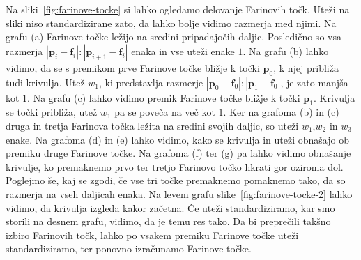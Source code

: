 \documentclass[isrm2, tisk]{fmfdelo}
\newcommand{\p}{\mathbf{p}}
\begin{document}
    Na sliki~\ref{fig:farinove-tocke} si lahko ogledamo delovanje Farinovih točk.
    Uteži na sliki niso standardizirane zato, da lahko bolje vidimo razmerja med njimi.
    Na grafu (a) Farinove točke ležijo na sredini pripadajočih daljic.
    Posledično so vsa razmerja $|\p_i-\mathbf{f}_i|:|\p_{i+1}-\mathbf{f}_i|$ enaka in vse uteži enake $1$.
    Na grafu (b) lahko vidimo, da se s premikom prve Farinove točke bližje k točki $\p_0$, k njej približa tudi krivulja.
    Utež $w_1$, ki predstavlja razmerje $|\p_0-\mathbf{f}_0|:|\p_{1}-\mathbf{f}_0|$, je zato manjša kot $1$.
    Na grafu (c) lahko vidimo premik Farinove točke bližje k točki $\p_1$.
    Krivulja se točki približa, utež $w_1$ pa se poveča na več kot $1$.
    Ker na grafoma (b) in (c) druga in tretja Farinova točka ležita na sredini svojih daljic, so uteži $w_1$,$w_2$ in $w_3$ enake.
    Na grafoma (d) in (e) lahko vidimo, kako se krivulja in uteži obnašajo ob premiku druge Farinove točke.
    Na grafoma (f) ter (g) pa lahko vidimo obnašanje krivulje, ko premaknemo prvo ter tretjo Farinovo točko hkrati gor oziroma dol.
    Poglejmo še, kaj se zgodi, če vse tri točke premaknemo pomaknemo tako, da so razmerja na vseh daljicah enaka.
    Na levem grafu slike~\ref{fig:farinove-tocke-2} lahko vidimo, da krivulja izgleda kakor začetna.
    Če uteži standardiziramo, kar smo storili na desnem grafu, vidimo, da je temu res tako.
    Da bi preprečili takšno izbiro Farinovih točk, lahko po vsakem premiku Farinove točke uteži standardiziramo, ter ponovno izračunamo Farinove točke.
\end{document}
